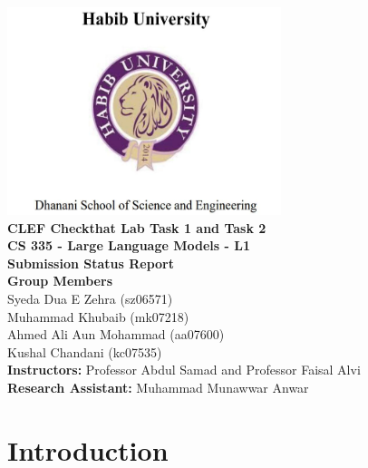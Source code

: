 \documentclass{article}
\begin{document}
\begin{center}
    {\includegraphics[width=8cm]{LOGOHABIB.png} \\
    \vspace{10mm}}
    {\LARGE \textbf{CLEF Checkthat Lab Task 1 and Task 2}} \\
    \vspace{5mm}
    {\Large \textbf{CS 335 - Large Language Models - L1}} \\
    \vspace{10mm}
    {\Huge \textbf{Submission Status Report}} \\
    \vspace{10mm}
    {\Large \textbf{Group Members}} \\
    \vspace{5mm}
    {\large Syeda Dua E Zehra (sz06571)} \\
    \vspace{2mm}
    {\large Muhammad Khubaib (mk07218)} \\
    \vspace{2mm}
    {\large Ahmed Ali Aun Mohammad (aa07600)} \\
    \vspace{2mm}
    {\large Kushal Chandani (kc07535)} \\
    \vspace{4mm}
    {\large \textbf{Instructors:} Professor Abdul Samad and Professor Faisal Alvi} \\
    \vspace{4mm}
    {\large \textbf{Research Assistant:} Muhammad Munawwar Anwar } \\
\end{center}

\newpage

\tableofcontents

\newpage

\section{\textcolor{sectioncolor}{Introduction}}
\end{document}
